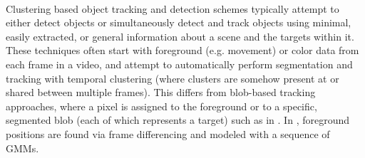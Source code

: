\documentclass{article}
\begin{document}
\\
Clustering based object tracking and detection schemes typically attempt to either detect objects or simultaneously detect and track objects using minimal, easily extracted, or general information about a scene and the targets within it. These techniques often start with foreground (e.g. movement) or color data from each frame in a video, and attempt to automatically perform segmentation and tracking with temporal clustering (where clusters are somehow present at or shared between multiple frames). This differs from blob-based tracking approaches, where a pixel is assigned to the foreground or to a specific, segmented blob (each of which represents a target) such as in \cite{stauffer_1999}. In \cite{pece_2002}, foreground positions are found via frame differencing and modeled with a sequence of GMMs.\\
\cite{beleznai_2006}
\cite{dickinson_2005}
\cite{schiele_2006}
  \\
\\
\end{document}
